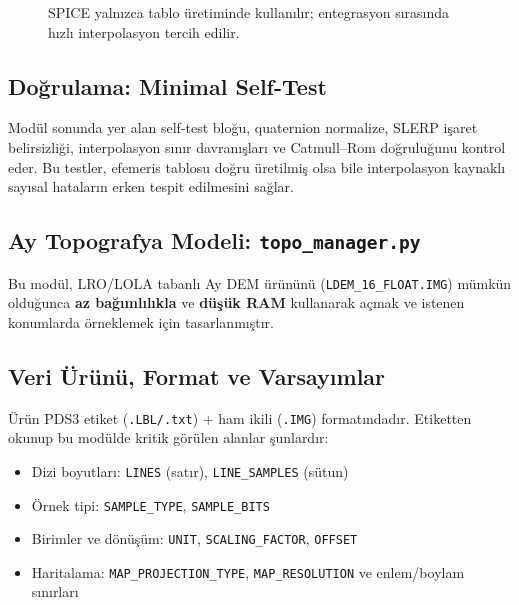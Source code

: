 \begin{figure}[H]
\centering
{}
\caption{SPICE yalnızca tablo üretiminde kullanılır; entegrasyon sırasında hızlı interpolasyon tercih edilir.}
\end{figure}

\subsection*{Doğrulama: Minimal Self-Test}

Modül sonunda yer alan self-test bloğu,
quaternion normalize, SLERP işaret belirsizliği,
interpolasyon sınır davranışları ve Catmull--Rom doğruluğunu kontrol eder.
Bu testler, efemeris tablosu doğru üretilmiş olsa bile
interpolasyon kaynaklı sayısal hataların erken tespit edilmesini sağlar.


\newpage
\subsection{Ay Topografya Modeli: \texttt{topo\_manager.py}}

Bu modül, LRO/LOLA tabanlı Ay DEM ürününü (\texttt{LDEM\_16\_FLOAT.IMG}) mümkün olduğunca \textbf{az bağımlılıkla} ve \textbf{düşük RAM} kullanarak açmak ve istenen konumlarda örneklemek için tasarlanmıştır.


\subsection*{Veri Ürünü, Format ve Varsayımlar}
Ürün PDS3 etiket (\texttt{.LBL/.txt}) + ham ikili (\texttt{.IMG}) formatındadır.
Etiketten okunup bu modülde kritik görülen alanlar şunlardır:
\begin{itemize}
  \item Dizi boyutları: \texttt{LINES} (satır), \texttt{LINE\_SAMPLES} (sütun)
  \item Örnek tipi: \texttt{SAMPLE\_TYPE}, \texttt{SAMPLE\_BITS}
  \item Birimler ve dönüşüm: \texttt{UNIT}, \texttt{SCALING\_FACTOR}, \texttt{OFFSET}
  \item Haritalama: \texttt{MAP\_PROJECTION\_TYPE}, \texttt{MAP\_RESOLUTION} ve enlem/boylam sınırları
\end{itemize}

